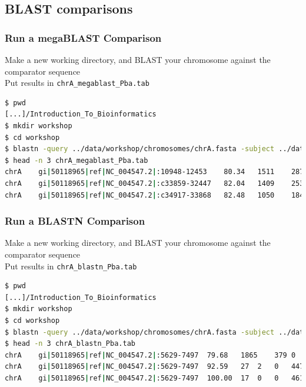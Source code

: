 \documentclass[table]{beamer}
\begin{document}
  \subsection{BLAST comparisons}
  \begin{frame}[fragile]
    \frametitle{Run a megaBLAST Comparison}
    Make a new working directory, and BLAST your chromosome against the comparator sequence \\
    Put results in \texttt{chrA\_megablast\_Pba.tab}
    \begin{lstlisting}[language=bash]
$ pwd
[...]/Introduction_To_Bioinformatics
$ mkdir workshop
$ cd workshop
$ blastn -query ../data/workshop/chromosomes/chrA.fasta -subject ../data/workshop/chromosomes/NC_004547.fna -out chrA_megablast_Pba.tab -outfmt 6 
$ head -n 3 chrA_megablast_Pba.tab 
chrA	gi|50118965|ref|NC_004547.2|:10948-12453	80.34	1511	287	10	4579450	4580955	1506	1	0.0	1136
chrA	gi|50118965|ref|NC_004547.2|:c33859-32447	82.04	1409	253	0	4563151	4564559	1	1409	0.0	1201
chrA	gi|50118965|ref|NC_004547.2|:c34917-33868	82.48	1050	184	0	4562093	4563142	1	1050	0.0	 920
    \end{lstlisting}
\end{frame} 
    
  \begin{frame}[fragile]
    \frametitle{Run a BLASTN Comparison}
    Make a new working directory, and BLAST your chromosome against the comparator sequence \\
    Put results in \texttt{chrA\_blastn\_Pba.tab}
    \begin{lstlisting}[language=bash]
$ pwd
[...]/Introduction_To_Bioinformatics
$ mkdir workshop
$ cd workshop
$ blastn -query ../data/workshop/chromosomes/chrA.fasta -subject ../data/workshop/chromosomes/NC_004547.fna -out chrA_blastn_Pba.tab -outfmt 6 -task blastn
$ head -n 3 chrA_blastn_Pba.tab 
chrA	gi|50118965|ref|NC_004547.2|:5629-7497	79.68	1865	379	0	4584915	4586779	1865	1	0.0	1654
chrA	gi|50118965|ref|NC_004547.2|:5629-7497	92.59	27	2	0	4479367	4479393	1254	1280	0.004	41.0
chrA	gi|50118965|ref|NC_004547.2|:5629-7497	100.00	17	0	0	4613022	4613038	52	36	2.1	31.9
    \end{lstlisting}
\end{frame}     
    
\end{document}
